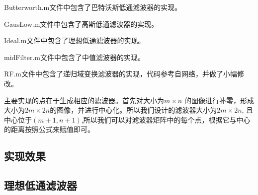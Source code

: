\documentclass[11pt, a4paper, UTF8]{ctexart}
\begin{document}
    Butterworth.m文件中包含了巴特沃斯低通滤波器的实现。\par 
    GausLow.m文件中包含了高斯低通滤波器的实现。 \par 
    Ideal.m文件中包含了理想低通滤波器的实现。\par 
    midFilter.m文件中包含了中值滤波器的实现。\par 
    RF.m文件中包含了递归域变换滤波器的实现，代码参考自网络，并做了小幅修改。 \par


    主要实现的点在于生成相应的滤波器。首先对大小为$m \times n$ 的图像进行补零，形成大小为$2m \times 2n$的图像，并进行中心化。所以我们设计的滤波器大小为$2m \times 2n$, 且 中心位于$(m+1,n+1)$,所以我们可以对滤波器矩阵中的每个点，根据它与中心的距离按照公式来赋值即可。

    \subsection{实现效果}

    \subsection{理想低通滤波器}
\end{document}
